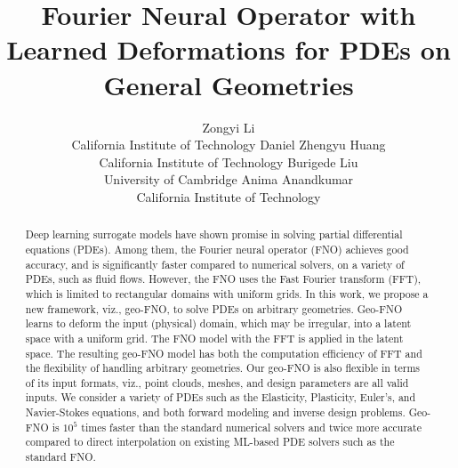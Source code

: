 \documentclass{article}
\title{Fourier Neural Operator with Learned Deformations for PDEs on General Geometries}
\author{%
  Zongyi Li\\
  California Institute of Technology
  \And
  Daniel Zhengyu Huang\\
  California Institute of Technology 
  \And
  Burigede Liu \\
  University of Cambridge
  \And
  Anima Anandkumar\\
  California Institute of Technology
}
\begin{document}
\maketitle


\begin{abstract}
Deep learning surrogate models have shown promise in solving partial differential equations (PDEs). Among them, the Fourier neural operator (FNO) achieves good accuracy, and is significantly faster compared to numerical solvers,  on a variety of   PDEs, such as fluid flows. However, the FNO uses the Fast Fourier transform  (FFT), which is limited to rectangular domains with uniform grids. In this work, we propose a new framework, viz., geo-FNO, to solve PDEs on arbitrary geometries. Geo-FNO learns to deform the input (physical) domain, which may be irregular, into a latent space with a uniform grid. The FNO model with the FFT is applied in the latent space. The resulting geo-FNO model has both the computation efficiency of FFT and the flexibility of handling arbitrary geometries. Our geo-FNO is also flexible in terms of its input formats, viz.,  point clouds, meshes, and design parameters are all valid inputs. We consider a variety of PDEs such as the Elasticity, Plasticity, Euler's, and Navier-Stokes equations, and both forward modeling and inverse design problems. Geo-FNO is $10^5$ times faster than the standard numerical solvers and twice more accurate compared to direct interpolation on existing ML-based PDE solvers such as the standard FNO.

\end{abstract}
\end{document}

